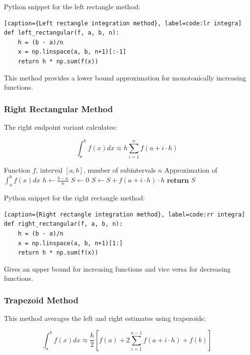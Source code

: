 \documentclass[10pt]{article}
\begin{document}
Python snippet for the left rectangle method:
\begin{lstlisting}[style=custompython][caption={Left rectangle integration method}, label=code:lr integra]
def left_rectangular(f, a, b, n):
    h = (b - a)/n
    x = np.linspace(a, b, n+1)[:-1]
    return h * np.sum(f(x))
\end{lstlisting}


This method provides a lower bound approximation for monotonically increasing functions.


\subsubsection{Right Rectangular Method}
The right endpoint variant calculates:

\begin{equation}
\int_{a}^{b} f(x)dx \approx h\sum_{i=1}^{n} f(a + i\cdot h)
\end{equation}

\begin{algorithm}[H]
\caption{Right Rectangular Integration}
\begin{algorithmic}[1]
\Require Function $f$, interval $[a, b]$, number of subintervals $n$
\Ensure Approximation of $\int_{a}^{b} f(x) dx$
\State $h \gets \frac{b - a}{n}$
\State $S \gets 0$
    \State $S \gets S + f(a + i \cdot h) \cdot h$
\EndFor
\State \textbf{return} $S$
\end{algorithmic}
\end{algorithm}

Python snippet for the right rectangle method:
\begin{lstlisting}[style=custompython][caption={Right rectangle integration method}, label=code:rr integra]
def right_rectangular(f, a, b, n):
    h = (b - a)/n
    x = np.linspace(a, b, n+1)[1:]
    return h * np.sum(f(x))
\end{lstlisting}

Gives an upper bound for increasing functions and vice versa for decreasing functions.

\subsubsection{Trapezoid Method}

This method averages the left and right estimates using trapezoids:

\begin{equation}
\int_{a}^{b} f(x)dx \approx \frac{h}{2}\left[f(a) + 2\sum_{i=1}^{n-1}f(a+i\cdot h) + f(b)\right]
\end{equation}
\end{document}
